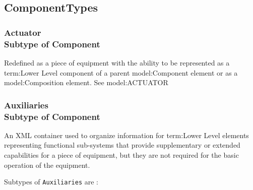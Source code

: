 \subsection{ComponentTypes} \label{model:ComponentTypes}
\subsubsection[Actuator]{Actuator \\ {\small Subtype of Component}}
  \label{type:Actuator}

\FloatBarrier

Redefined as a piece of equipment with the ability to be represented as a {term:Lower Level} component of a parent {model:Component} element or as a {model:Composition} element. See {model:ACTUATOR}

\FloatBarrier
\subsubsection[Auxiliaries]{Auxiliaries \\ {\small Subtype of Component}}
  \label{type:Auxiliaries}

\FloatBarrier

An XML container used to organize information for {term:Lower Level} elements representing functional sub-systems that provide supplementary or extended capabilities for a piece of equipment, but they are not required for the basic operation of the equipment.

Subtypes of \texttt{Auxiliaries} are : 

